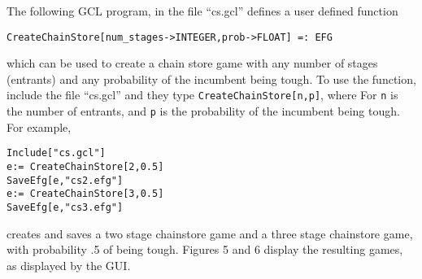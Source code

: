 The following GCL program, in the file ``cs.gcl'' defines a user
defined function

\protect \large \begin{verbatim}
CreateChainStore[num_stages->INTEGER,prob->FLOAT] =: EFG
\end{verbatim} \normalsize

\noindent
which can be used to create a chain store game with any number of
stages (entrants) and any probability of the incumbent being tough.
To use the function, include the file ``cs.gcl'' and they type
\verb+CreateChainStore[n,p]+, where For \verb+n+ is the number of
entrants, and \verb+p+ is the probability of the incumbent being
tough. For example, 

\begin{verbatim}
Include["cs.gcl"]
e:= CreateChainStore[2,0.5]
SaveEfg[e,"cs2.efg"]
e:= CreateChainStore[3,0.5]
SaveEfg[e,"cs3.efg"]
\end{verbatim}

\noindent
creates and saves a two stage chainstore game and a three stage
chainstore game, with probability .5 of being tough. Figures 5 and 6
display the resulting games, as displayed by the GUI. 

